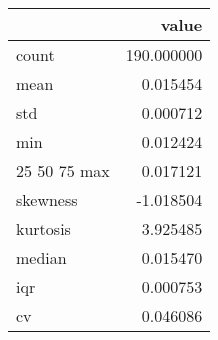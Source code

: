 \begin{tabular}{lr}
\toprule
 & value \\
\midrule
count & 190.000000 \\
mean & 0.015454 \\
std & 0.000712 \\
min & 0.012424 \\
25%
50%
75%
max & 0.017121 \\
skewness & -1.018504 \\
kurtosis & 3.925485 \\
median & 0.015470 \\
iqr & 0.000753 \\
cv & 0.046086 \\
\bottomrule
\end{tabular}
